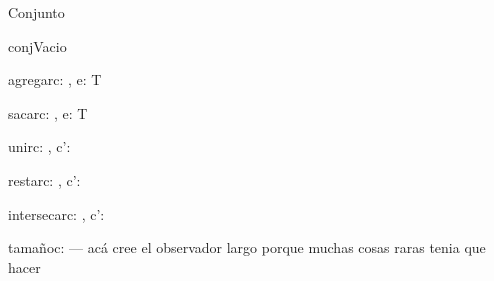 \documentclass[10pt,a4paper]{article}
\begin{document}
\begin{tad}{Conjunto}
    \begin{proc}{conjVacio}{}{\nt}
    \end{proc}
    \begin{proc}{agregar}{\Inout c: \nt, \In e: T}{}
    \end{proc}
    \begin{proc}{sacar}{\Inout c: \nt, \In e: T}{}
    \end{proc} 
    \begin{proc}{unir}{\Inout c: \nt, \In c': \nt}{}
    \end{proc}
    \begin{proc}{restar}{\Inout c: \nt, \In c': \nt}{}
    \end{proc}
    \begin{proc}{intersecar}{\Inout c: \nt, \In c': \nt}{}
    \end{proc}
    \begin{proc}{tamaño}{\In c: \nt}{\nat}
        {\color{red} --- acá cree el observador largo porque muchas cosas raras tenia que hacer}
        \\
    \end{proc}
\end{tad}
\pagebreak
\end{document}
